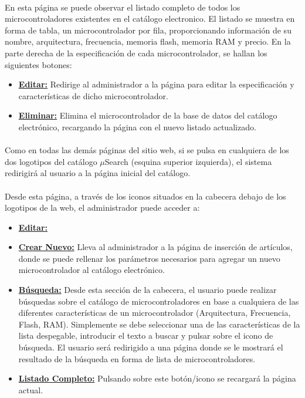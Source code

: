 \paragraph{}En esta página se puede observar el listado completo de todos los microcontroladores existentes en el catálogo electronico. El listado se muestra en forma de tabla, un microcontrolador por fila, proporcionando información de su nombre, arquitectura, frecuencia, memoria flash, memoria RAM y precio. En la parte derecha de la especificación de cada microcontrolador, se hallan los siguientes botones:
\begin{itemize}
	\item \textbf{\underline{Editar:}} Redirige al administrador a la página para editar la especificación y características de dicho microcontrolador.
	\item \textbf{\underline{Eliminar:}} Elimina el microcontrolador de la base de datos del catálogo electrónico, recargando la página con el nuevo listado actualizado.
\end{itemize}

\paragraph{}Como en todas las demás páginas del sitio web, si se pulsa en cualquiera de los dos logotipos del catálogo $\mu$Search (esquina superior izquierda), el sistema redirigirá al usuario a la página inicial del catálogo.

\paragraph{}Desde esta página, a través de los iconos situados en la cabecera debajo de los logotipos de la web, el administrador puede acceder a:

\begin{itemize}
	\item \underline{\textbf{Editar:}}
	
	\item \underline{\textbf{Crear Nuevo:}} Lleva al administrador a la página de inserción de artículos, donde se puede rellenar los parámetros necesarios para agregar un nuevo microcontrolador al catálogo electrónico.

	\item \underline{\textbf{Búsqueda:}} Desde esta sección de la cabecera, el usuario puede realizar búsquedas sobre el catálogo de microcontroladores en base a cualquiera de las diferentes características de un microcontrolador (Arquitectura, Frecuencia, Flash, RAM). Simplemente se debe seleccionar una de las características de la lista despegable, introducir el texto a buscar y pulsar sobre el icono de búsqueda.
	El usuario será redirigido a una página donde se le mostrará el resultado de la búsqueda en forma de lista de microcontroladores.
			
	\item \underline{\textbf{Listado Completo:}} Pulsando sobre este botón/icono se recargará la página actual.
\end{itemize}